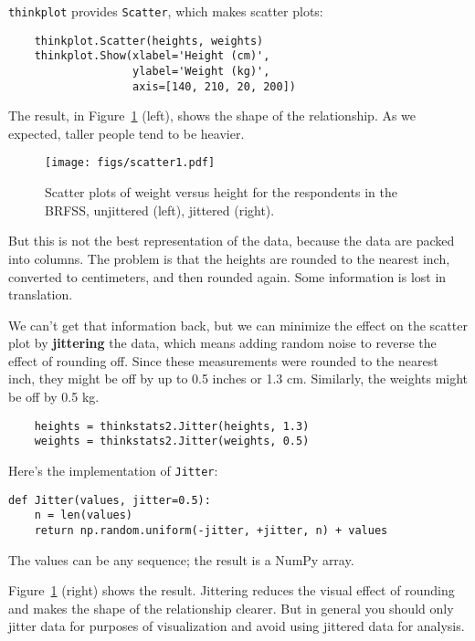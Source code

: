 \documentclass[12pt]{book}
\begin{document}
{\tt thinkplot} provides {\tt Scatter}, which makes scatter plots:
%
\begin{verbatim}
    thinkplot.Scatter(heights, weights)
    thinkplot.Show(xlabel='Height (cm)',
                   ylabel='Weight (kg)',
                   axis=[140, 210, 20, 200])
\end{verbatim}

The result, in Figure~\ref{scatter1} (left), shows the shape of
the relationship.  As we expected, taller
people tend to be heavier.  

\begin{figure}
\centerline{\texttt{[image: figs/scatter1.pdf]}}
\caption{Scatter plots of weight versus height for the respondents
in the BRFSS, unjittered (left), jittered (right).}
\label{scatter1}
\end{figure}

But this is not the best representation of
the data, because the data are packed into columns.  The problem is
that the heights are rounded to the nearest inch, converted to
centimeters, and then rounded again.  Some information is lost in
translation.    

We can't get that information back, but we can minimize the effect on
the scatter plot by {\bf jittering} the data, which means adding random
noise to reverse the effect of rounding off.  Since these measurements
were rounded to the nearest inch, they might be off by up to 0.5 inches or
1.3 cm.  Similarly, the weights might be off by 0.5 kg.

%
\begin{verbatim}
    heights = thinkstats2.Jitter(heights, 1.3)
    weights = thinkstats2.Jitter(weights, 0.5)
\end{verbatim}

Here's the implementation of {\tt Jitter}:

\begin{verbatim}
def Jitter(values, jitter=0.5):
    n = len(values)
    return np.random.uniform(-jitter, +jitter, n) + values
\end{verbatim}

The values can be any sequence; the result is a NumPy array.

Figure~\ref{scatter1} (right) shows the result.  Jittering reduces the
visual effect of rounding and makes the shape of the relationship
clearer.  But in general you should only jitter data for purposes of
visualization and avoid using jittered data for analysis.
\end{document}
